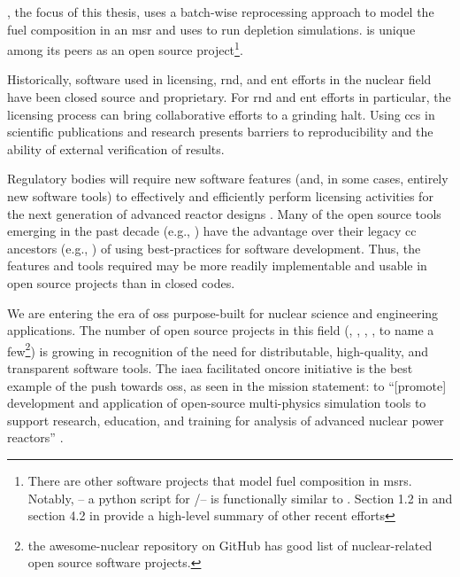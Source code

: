 \SaltProc\cite{rykhlevskii_saltproc_2018}, the focus of this thesis, uses a
batch-wise reprocessing approach to model the fuel composition in an \Gls{msr}
and uses \SerpentTWO\cite{leppanen_serpent_2014} to run depletion simulations.
\SaltProc is unique among its peers as an open source project\footnote{There are
other software projects that model fuel composition in \Gls{msr}s. Notably,
\ChemTriton\cite{betzler_molten_2017} -- a python script for \SCALE/\TRITON --
is functionally similar to \SaltProc. Section 1.2 in
\cite{rykhlevskii_fuel_2020} and section 4.2 in \cite{rykhlevskii_advanced_2018}
provide a high-level summary of other recent efforts}.

Historically, software used in licensing, \gls{rnd}, and \gls{ent} efforts in
the nuclear field have been closed source and proprietary. For \Gls{rnd} and
\Gls{ent} efforts in particular, the licensing process can bring collaborative
efforts to a grinding halt. Using \gls{cc}s in scientific publications and
research presents barriers to reproducibility and the ability of external
verification of results.
    
Regulatory bodies will require new software features (and, in some cases,
entirely new software tools) to effectively and efficiently perform licensing
activities for the next generation of advanced reactor designs
\cite{usnrc_nonlwr_2020-1}. Many of the open source tools emerging in the
past decade (e.g., \OpenMC\cite{romano_openmc_2015}) have the advantage over
their legacy \Gls{cc} ancestors (e.g., \SerpentTWO \cite{leppanen_serpent_2014})
of using best-practices for software development. Thus, the features
and tools required may be more readily implementable and usable in open source
projects than in closed codes.
    
We are entering the era of \gls{oss} purpose-built for nuclear
science and engineering applications. The number of open source projects in this
field
(\ONIX\cite{de_troullioud_de_lanversin_onix_2021}, \OpenMC,
\NJOYTWOONE\cite{noauthor_njoy21_2022}, \Cyclus\cite{noauthor_cyclus_2022}, to
name a few\footnote{the awesome-nuclear repository on GitHub
\cite{romano_awesome_2022} has good list of nuclear-related open source software
projects.}) is growing in recognition of the need for distributable,
high-quality, and transparent software tools. The
\Gls{iaea} facilitated \Gls{oncore} initiative \cite{fiorina_initiative_2021} is the best
example of the push towards \Gls{oss}, as seen in the mission
statement: to
``[promote] development and application of open-source multi-physics simulation
tools to support research, education, and training for analysis of advanced
nuclear power reactors'' \cite{iaea_open-source_2022}. 


